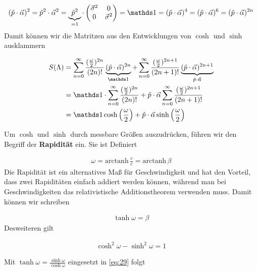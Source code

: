 \begin{align}
  \label{eq:26}
  (\hat p\cdot\vec \alpha)^2 =\hat p^2\cdot\vec \alpha^2 = \underbr{\hat p^2}_{=1}\cdot
  \begin{pmatrix}
    \vec \sigma^2&0\\
    0&\vec \sigma^2
  \end{pmatrix} = \mathds 1 = (\hat p\cdot\vec \alpha)^4 =(\hat p\cdot\vec \alpha)^6 = (\hat p\cdot\vec \alpha)^{2n}
\end{align}
Damit können wir die Matritzen aus den Entwicklungen von \(\cosh\) und \(\sinh\) ausklammern

\begin{align}
  \label{eq:27}
   S(\Lambda)  &=\sum_{n=0}^{\infty}\frac{(\frac{\omega}{2})^{2n}}{(2n)!}\underbr{(\hat p\cdot\vec \alpha)^{2n}}_{\mathds 1} +
   \sum_{n=0}^{\infty}\frac{(\frac{\omega}{2})^{2n+1}}{(2n+1)!}\underbr{(\hat p\cdot\vec \alpha)^{2n+1}}_{\hat p\cdot\vec\alpha}\notag\\
 &=\mathds 1\cdot \sum_{n=0}^{\infty}\frac{ (\frac{\omega}{2})^{2n}}{(2n)!} +
  \hat p\cdot\vec\alpha \sum_{n=0}^{\infty}\frac{(\frac{\omega}{2})^{2n+1} }{(2n+1)!}\notag\\
&= \mathds 1 \cosh\left(\frac{\omega}{2}\right) + \hat p\cdot\vec \alpha \sinh\left(\frac{\omega}{2} \right)
\end{align}

Um \(\cosh\) und \(\sinh\) durch messbare Größen auszudrücken, führen wir den Begriff der \textbf{Rapidität} ein. Sie ist Definiert

\begin{align}
  \label{eq:20}
  \boxed{ \omega = \text{arctanh}\, \frac{v}{c} = \text{arctanh}\,\beta }
\end{align}
Die Rapidität ist ein alternatives Maß für Geschwindigkeit und hat den Vorteil, dass zwei Rapiditäten einfach addiert werden können, während man bei Geschwindigkeiten das relativistische Additionstheorem verwenden muss. Damit können wir schreiben

\begin{align}
  \label{eq:28}
  \tanh\omega = \beta
\end{align}
Desweiteren gilt

\begin{align}
  \label{eq:29}
  \cosh^2 \omega - \sinh^2\omega = 1
\end{align}

Mit \(\tanh\omega = \frac{\sinh\omega}{\cosh\omega}\) eingesetzt in \eqref{eq:29} folgt

